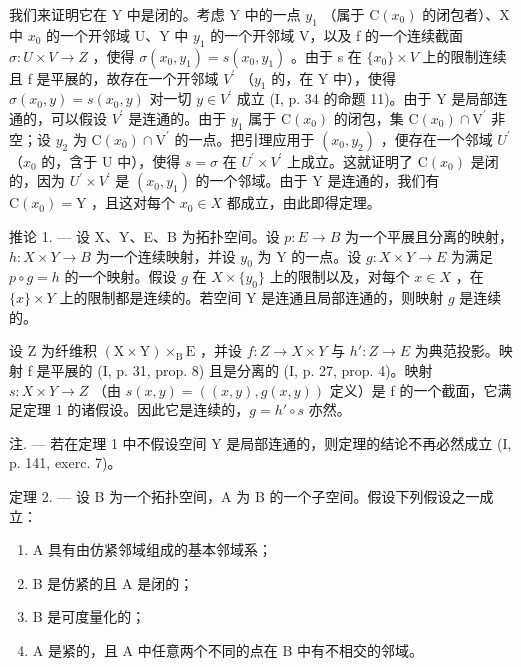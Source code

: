 我们来证明它在 Y 中是闭的。考虑 Y 中的一点 \(y_{1}\) （属于 \(\mathrm{C}(x_{0})\) 的闭包者）、X 中 \(x_{0}\) 的一个开邻域 U、Y 中 \(y_{1}\) 的一个开邻域 V，以及 f 的一个连续截面 \(\sigma\colon U\times V\to Z\) ，使得 \(\sigma(x_{0},y_{1})=s(x_{0},y_{1})\) 。由于 s 在 \(\{x_{0}\}\times V\) 上的限制连续且 f 是平展的，故存在一个开邻域 \(V^{\prime}\) （\(y_{1}\) 的，在 Y 中），使得 \(\sigma(x_{0},y)=s(x_{0},y)\) 对一切 \(y\in V^{\prime}\) 成立 (I, p. 34 的命题 11)。由于 Y 是局部连通的，可以假设 \(V^{\prime}\) 是连通的。由于 \(y_{1}\) 属于 \(\mathrm{C}(x_{0})\) 的闭包，集 \(\mathrm{C}(x_{0})\cap\mathrm{V}^{\prime}\) 非空；设 \(y_{2}\) 为 \(\mathrm{C}(x_{0})\cap\mathrm{V}^{\prime}\) 的一点。把引理应用于 \((x_{0},y_{2})\) ，便存在一个邻域 \(U^{\prime}\) （\(x_{0}\) 的，含于 U 中），使得 \(s=\sigma\) 在 \(U^{\prime} \times V^{\prime}\) 上成立。这就证明了 \(\mathrm{C}(x_{0})\) 是闭的，因为 \(U^{\prime} \times V^{\prime}\) 是 \((x_{0}, y_{1})\) 的一个邻域。由于 Y 是连通的，我们有 \(\mathrm{C}(x_{0}) = \mathrm{Y}\) ，且这对每个 \(x_{0} \in X\) 都成立，由此即得定理。

推论 1. --- 设 X、Y、E、B 为拓扑空间。设 \(p\colon E \to B\) 为一个平展且分离的映射，\(h\colon X \times Y \to B\) 为一个连续映射，并设 \(y_0\) 为 Y 的一点。设 \(g\colon X \times Y \to E\) 为满足 \(p \circ g = h\) 的一个映射。假设 \(g\) 在 \(X \times \{y_0\}\) 上的限制以及，对每个 \(x \in X\) ，在 \(\{x\} \times Y\) 上的限制都是连续的。若空间 Y 是连通且局部连通的，则映射 \(g\) 是连续的。

设 Z 为纤维积 \((\mathrm{X} \times \mathrm{Y}) \times_{\mathrm{B}} \mathrm{E}\) ，并设 \(f: Z \to X \times Y\) 与 \(h': Z \to E\) 为典范投影。映射 f 是平展的 (I, p. 31, prop. 8) 且是分离的 (I, p. 27, prop. 4)。映射 \(s: X \times Y \to Z\) （由 \(s(x, y) = ((x, y), g(x, y))\) 定义）是 f 的一个截面，它满足定理 1 的诸假设。因此它是连续的，\(g = h' \circ s\) 亦然。

注. --- 若在定理 1 中不假设空间 Y 是局部连通的，则定理的结论不再必然成立 (I, p. 141, exerc. 7)。

定理 2. --- 设 B 为一个拓扑空间，A 为 B 的一个子空间。假设下列假设之一成立：

\begin{enumerate}
\def\labelenumi{(\roman{enumi})}
\item
  A 具有由仿紧邻域组成的基本邻域系；
\item
  B 是仿紧的且 A 是闭的；
\item
  B 是可度量化的；
\item
  A 是紧的，且 A 中任意两个不同的点在 B 中有不相交的邻域。
\end{enumerate}

